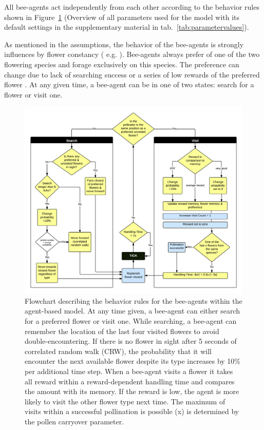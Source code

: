 All bee-agents act independently from each other according to the behavior rules shown in Figure~\ref{fig:flowchart} (Overview of all parameters used for the model with its default settings in the supplementary material in tab.~\ref{tab:parametervalues}).  

As mentioned in the assumptions, the behavior of the bee-agents is strongly influences by flower constancy ( e.g. \citealp{bobisud1975pollinator, chittka1997foraging, thomson1981field, chittka1999flower,  goulson1994model,  goulson1999foraging}). Bee-agents always prefer of one of the two flowering species and forage exclusively on this species. The preference can change due to lack of searching success or a series of low rewards of the preferred flower \citep{chittka1997foraging,kunin1993sex,greggers1993memory}. At any given time, a bee-agent can be in one of two states: search for a flower or visit one. 


\begin{figure} [!ht] %
	\centering
	\includegraphics[width=14cm]{Images/flowchart-model}
	\caption{Flowchart describing the behavior rules for the bee-agents within the agent-based model. At any time given, a bee-agent can either search for a preferred flower or visit one. While searching, a bee-agent can remember the location of the last four visited flowers to avoid double-encountering. If there is no flower in sight after 5 seconds of correlated random walk (CRW), the probability that it will encounter the next available flower despite its type increases by 10\% per additional time step. When a bee-agent visits a flower it takes all reward within a reward-dependent handling time and compares the amount with its memory. If the reward is low, the agent is more likely to visit the other flower type next time. The maximum of visits within a successful pollination is possible (x) is determined by the pollen carryover parameter.}
	\label{fig:flowchart}
\end{figure}


